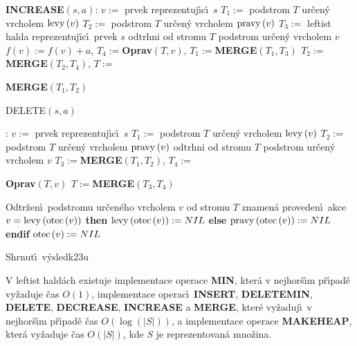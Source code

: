 {\bf INCREASE$\left(s,a\right)$}:\newline 
$v:=$ prvek reprezentuj\'\i c\'\i\ $s$\newline 
$T_1:=$ podstrom $T$ ur\v cen\'y vrcholem $\operatorname{levy}\left(v\right)$\newline 
$T_2:=$ podstrom $T$ ur\v cen\'y  vrcholem $\operatorname{pravy}\left(v\right)$\newline 
$T_3:=$ leftist halda reprezentuj\'\i c\'\i\ prvek $s$\newline 
odtrhni od stromu $T$ podstrom ur\v cen\'y vrcholem $v$\newline 
$f\left(v\right):=f\left(v\right)+a$, $T_4:=${\bf Oprav$\left(T,v\right)$}, $T_1:=${\bf MERGE$\left(T_1
,T_3\right)$\newline 
$T_2:=$MERGE$\left(T_2,T_4\right)$}, $T:=${\bf MERGE$\left(T_1,T_2\right)$
\bigskip

DELETE$\left(s,a\right)$}:\newline 
$v:=$ prvek reprezentuj\'\i c\'\i\ $s$\newline 
$T_1:=$ podstrom $T$ ur\v cen\'y vrcholem $\operatorname{levy}\left(v\right)$\newline 
$T_2:=$ podstrom $T$ ur\v cen\'y  vrcholem $\operatorname{pravy}\left(v\right)$\newline 
odtrhni od stromu $T$ podstrom ur\v cen\'y vrcholem $v$\newline 
$T_3:=${\bf MERGE$\left(T_1,T_2\right)$}, $T_4:=${\bf Oprav$\left(T,v\right)$\newline 
$T:=$MERGE$\left(T_3,T_4\right)$
\bigskip

}\flushpar Odtr\v zen\'\i\ podstromu ur\v cen\'eho vrcholem $v$ od stromu $
T$ 
znamen\'a proveden\'\i\ akce\medskip
{} $v=\operatorname{levy}\left(\operatorname{otec}\left(v\right)\right)$ {\bf then}\newline 
\phantom{---}$\operatorname{levy}\left(\operatorname{otec}\left(v\right)\right):=NIL$\newline 
{\bf else}\newline 
\phantom{---}$\operatorname{pravy}\left(\operatorname{otec}\left(v\right)\right):=NIL$\newline 
{\bf endif}\newline 
$\operatorname{otec}\left(v\right):=NIL$
\medskip

\subhead
Shrnut\'\i\ v\'ysledk\accent23u
\endsubhead

V leftist hald\'ach existuje implementace operace 
{\bf MIN}, kter\'a v nejhor\v s\'\i m p\v r\'\i pad\v e vy\v zaduje \v cas $
O\left(1\right)$, 
implementace ope\-rac\'\i\ {\bf INSERT}, {\bf DELETEMIN}, {\bf DELETE}, 
{\bf DEC\-REA\-SE}, {\bf INCREA\-SE} a {\bf MERGE}, kter\'e vy\v zaduj\'\i\ v nejhor\v s\'\i m 
p\v r\'\i\-pa\-d\v e \v cas $O\left(\log\left(|S|\right)\right)$, a implementace operace {\bf MAKE\-HEAP},
kter\'a vy\v zaduje \v cas $O\left(|S|\right)$, kde $S$ je reprezentovan\'a mno\v zina.
\endproclaim
\medskip


